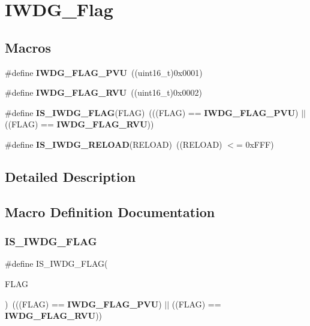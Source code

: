 \section{I\+W\+D\+G\+\_\+\+Flag}
\label{group__IWDG__Flag}
\subsection*{Macros}
\begin{DoxyCompactItemize}
\item 
\#define \textbf{ I\+W\+D\+G\+\_\+\+F\+L\+A\+G\+\_\+\+P\+VU}~((uint16\+\_\+t)0x0001)
\item 
\#define \textbf{ I\+W\+D\+G\+\_\+\+F\+L\+A\+G\+\_\+\+R\+VU}~((uint16\+\_\+t)0x0002)
\item 
\#define \textbf{ I\+S\+\_\+\+I\+W\+D\+G\+\_\+\+F\+L\+AG}(F\+L\+AG)~(((F\+L\+AG) == \textbf{ I\+W\+D\+G\+\_\+\+F\+L\+A\+G\+\_\+\+P\+VU}) $\vert$$\vert$ ((F\+L\+AG) == \textbf{ I\+W\+D\+G\+\_\+\+F\+L\+A\+G\+\_\+\+R\+VU}))
\item 
\#define \textbf{ I\+S\+\_\+\+I\+W\+D\+G\+\_\+\+R\+E\+L\+O\+AD}(R\+E\+L\+O\+AD)~((R\+E\+L\+O\+AD) $<$= 0x\+F\+F\+F)
\end{DoxyCompactItemize}


\subsection{Detailed Description}


\subsection{Macro Definition Documentation}
\mbox{\label{group__IWDG__Flag_ga5be9ae9ba267cf09a00523ef3e219293}} 
\subsubsection{I\+S\+\_\+\+I\+W\+D\+G\+\_\+\+F\+L\+AG}
{\footnotesize\ttfamily \#define I\+S\+\_\+\+I\+W\+D\+G\+\_\+\+F\+L\+AG(\begin{DoxyParamCaption}\item[{}]{F\+L\+AG }\end{DoxyParamCaption})~(((F\+L\+AG) == \textbf{ I\+W\+D\+G\+\_\+\+F\+L\+A\+G\+\_\+\+P\+VU}) $\vert$$\vert$ ((F\+L\+AG) == \textbf{ I\+W\+D\+G\+\_\+\+F\+L\+A\+G\+\_\+\+R\+VU}))}



